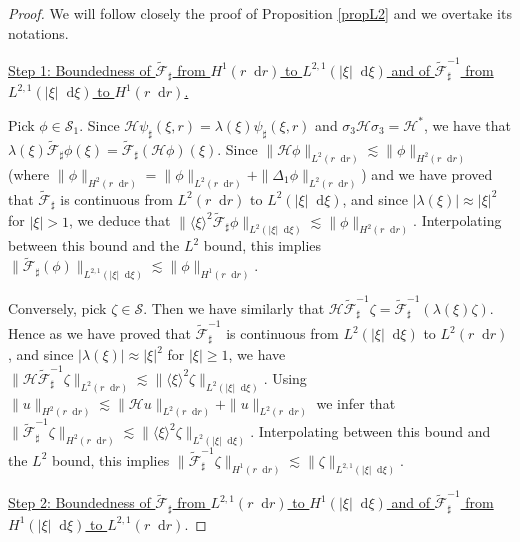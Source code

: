\documentclass[11 pt]{amsart}
\theoremstyle{definition}
\theoremstyle{remark}
\numberwithin{equation}{section}
\newcommand{\dd}{\mathop{}\!\mathrm{d}}
\begin{document}
\begin{proof} We will follow closely the proof of Proposition \ref{propL2} and we overtake its notations.

\medskip

\noindent \underline{Step 1: Boundedness of $\widetilde{\mathcal F}_\sharp$ from $H^1(r\dd r)$ to $L^{2,1}(|\xi|\dd \xi)$ and of $\widetilde{\mathcal F}^{-1}_\sharp$ from $L^{2,1}(|\xi|\dd \xi)$ to $H^1(r\dd r)$.}

Pick $\phi \in \mathcal S_1$. Since $\mathcal H \psi_\sharp(\xi,r)=\lambda(\xi)\psi_\sharp(\xi,r)$ and $\sigma_3 \mathcal{H} \sigma_3 = \mathcal{H}^*$, we have that $\lambda(\xi)\widetilde{\mathcal F}_\sharp \phi (\xi)=\widetilde{\mathcal F}_\sharp(\mathcal H \phi)(\xi)$. Since $ \| \mathcal H \phi \|_{L^2(r\dd r)}\lesssim  \|  \phi \|_{H^2(r\dd r)}$ (where $\|  \phi \|_{H^2(r\dd r)}=\|  \phi \|_{L^2(r\dd r)}+\|  \Delta_1 \phi \|_{L^2(r\dd r)}$) and we have proved that $\widetilde{\mathcal F}_\sharp$ is continuous from $L^2(r\dd r)$ to $L^{2}(|\xi|\dd \xi)$, and since $|\lambda(\xi)| \approx |\xi|^2$ for $|\xi|>1$, we deduce that $\| \langle \xi\rangle^2 \widetilde{\mathcal F}_\sharp  \phi \|_{L^2(|\xi|\dd \xi)} \lesssim  \|  \phi \|_{H^2(r\dd r)}$. Interpolating between this bound and the $L^2$ bound, this implies $\|  \widetilde{\mathcal F}_\sharp( \phi)\|_{L^{2,1}(|\xi|\dd \xi)} \lesssim  \|  \phi \|_{H^1(r\dd r)}$.

Conversely, pick $\zeta \in \mathcal S$. Then we have similarly that $\mathcal H \widetilde{\mathcal F}^{-1}_\sharp \zeta=\widetilde{\mathcal F}^{-1}_\sharp (\lambda (\xi)\zeta)$. Hence as we have proved that $\widetilde{\mathcal F}_\sharp^{-1}$ is continuous from $L^{2}(|\xi|\dd \xi)$ to $L^2(r\dd r)$, and since $|\lambda(\xi)|\approx |\xi|^2$ for $|\xi|\geq1$, we have $\|\mathcal H \widetilde{\mathcal F}^{-1}_\sharp \zeta \|_{L^2(r\dd r)}\lesssim \| \langle \xi \rangle^2 \zeta\|_{L^2(|\xi|\dd \xi)}$. Using $\| u\|_{H^2(r\dd r)}\lesssim \| \mathcal H u \|_{L^2(r\dd r)}+\| u \|_{L^2(r\dd r)}$ we infer that $\| \widetilde{\mathcal F}^{-1}_\sharp \zeta \|_{H^2(r\dd r)}\lesssim  \| \langle \xi \rangle^2 \zeta\|_{L^2(|\xi|\dd \xi)}$. Interpolating between this bound and the $L^2$ bound, this implies $\|  \widetilde{\mathcal F}_\sharp^{-1}\zeta\|_{H^{1}(r \dd r)} \lesssim  \|  \zeta \|_{L^{2,1}(|\xi| \dd \xi)}$.


\medskip

\noindent \underline{Step 2: Boundedness of $\widetilde{\mathcal F}_\sharp$ from $L^{2,1}(r\dd r)$ to $H^1(|\xi|\dd \xi)$ and of $\widetilde{\mathcal F}^{-1}_\sharp$ from $H^1(|\xi|\dd \xi)$ to $L^{2,1}(r\dd r)$}.


\end{proof}
\end{document}
